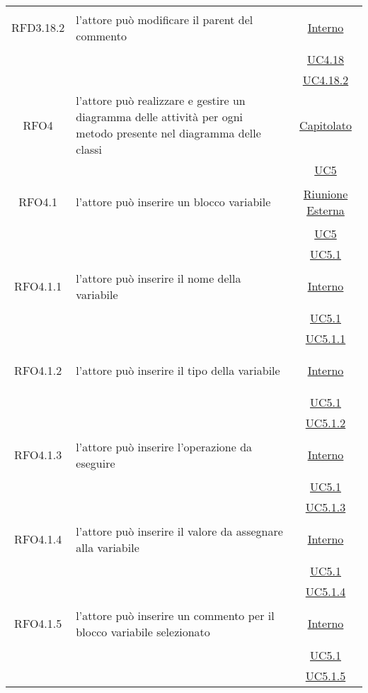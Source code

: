 \begin{longtable}{|c|>{\centering}m{7cm}|c|}
\hypertarget{RFD3.18.2}{RFD3.18.2} & l'attore può modificare il parent del commento &  \hyperlink{Interno}{Interno}\\
& &\hyperref[UC4.18]{UC4.18}\\
& &\hyperref[UC4.18.2]{UC4.18.2}\\ \hline

\hypertarget{RFO4}{RFO4} & l'attore può realizzare e gestire un diagramma delle attività per ogni metodo presente nel diagramma delle classi & \hyperlink{Capitolato}{Capitolato}\\
& & \hyperref[UC5]{UC5}\\ \hline

\hypertarget{RFO4.1}{RFO4.1} & l'attore può inserire un blocco variabile &  \hyperlink{Riunione Esterna}{Riunione Esterna}\\
& &\hyperref[UC5]{UC5}\\
& &\hyperref[UC5.1]{UC5.1}\\ \hline

\hypertarget{RFO4.1.1}{RFO4.1.1} & l'attore può inserire il nome della variabile & \hyperlink{Interno}{Interno}\\
& &\hyperref[UC5.1]{UC5.1}\\
& &\hyperref[UC5.1.1]{UC5.1.1}\\ \hline

\hypertarget{RFO4.1.2}{RFO4.1.2} & l'attore può inserire il tipo della variabile & \hyperlink{Interno}{Interno}\\
& &\hyperref[UC5.1]{UC5.1}\\
& &\hyperref[UC5.1.2]{UC5.1.2}\\ \hline

\hypertarget{RFO4.1.3}{RFO4.1.3} & l'attore può inserire l'operazione da eseguire & \hyperlink{Interno}{Interno}\\
& &\hyperref[UC5.1]{UC5.1}\\
& &\hyperref[UC5.1.3]{UC5.1.3}\\ \hline

\hypertarget{RFO4.1.4}{RFO4.1.4} & l'attore può inserire il valore da assegnare alla variabile &\hyperlink{Interno}{Interno}\\
& &\hyperref[UC5.1]{UC5.1}\\
& &\hyperref[UC5.1.4]{UC5.1.4}\\ \hline

\hypertarget{RFO4.1.5}{RFO4.1.5} & l'attore può inserire un commento per il blocco variabile selezionato&\hyperlink{Interno}{Interno}\\
& &\hyperref[UC5.1]{UC5.1}\\
& &\hyperref[UC5.1.5]{UC5.1.5}\\ \hline


\end{longtable}
